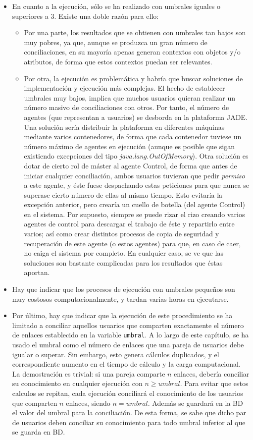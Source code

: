 \begin{itemize}
	\item En cuanto a la ejecución, sólo se ha realizado con umbrales iguales o superiores a 3. Existe una doble razón para ello:
	\begin{itemize}
		\item Por una parte, los resultados que se obtienen con umbrales tan bajos son muy pobres, ya que, aunque se produzca un gran número de conciliaciones, en su mayoría apenas generan contextos con objetos y/o atributos, de forma que estos contextos puedan ser relevantes.
		\item Por otra, la ejecución es problemática y habría que buscar soluciones de implementación y ejecución más complejas. El hecho de establecer umbrales muy bajos, implica que muchos usuarios quieran realizar un número masivo de conciliaciones con otros. Por tanto, el número de agentes (que representan a usuarios) se desborda en la plataforma JADE. Una solución sería distribuir la plataforma en diferentes máquinas mediante varios contenedores, de forma que cada contenedor tuviese un número máximo de agentes en ejecución (aunque es posible que sigan existiendo excepciones del tipo \emph{java.lang.OutOfMemory}). Otra solución es dotar de cierto rol de máster al agente Control, de forma que antes de iniciar cualquier conciliación, ambos usuarios tuvieran que pedir \emph{permiso} a este agente, y éste fuese despachando estas peticiones para que nunca se superase cierto número de ellas al mismo tiempo. Esto evitaría la excepción anterior, pero crearía un cuello de botella (del agente Control) en el sistema. Por supuesto, siempre se puede rizar el rizo creando varios agentes de control para descargar el trabajo de éste y repartirlo entre varios; así como crear distintos procesos de copia de seguridad y recuperación de este agente (o estos agentes) para que, en caso de caer, no caiga el sistema por completo. En cualquier caso, se ve que las soluciones son bastante complicadas para los resultados que éstas aportan.
	\end{itemize}
	\item Hay que indicar que los procesos de ejecución con umbrales pequeños son muy costosos computacionalmente, y tardan varias horas en ejecutarse.

	\item Por último, hay que indicar que la ejecución de este procedimiento se ha limitado a conciliar aquellos usuarios que comparten exactamente el número de enlaces establecido en la variable {\tt umbral}. A lo largo de este capítulo, se ha usado el umbral como el número de enlaces que una pareja de usuarios debe igualar o superar. Sin embargo, esto genera cálculos duplicados, y el correspondiente aumento en el tiempo de cálculo y la carga computacional. La demostración es trivial: si una pareja comparte $n$ enlaces, debería conciliar su conocimiento en cualquier ejecución con $n \geq umbral$. Para evitar que estos calculos se repitan, cada ejecución conciliará el conocimiento de los usuarios que comparten $n$ enlaces, siendo $n=umbral$. Además se guardará en la BD el valor del umbral para la conciliación. De esta forma, se sabe que dicho par de usuarios deben conciliar su conocimiento para todo umbral inferior al que se guarda en BD.
\end{itemize}

